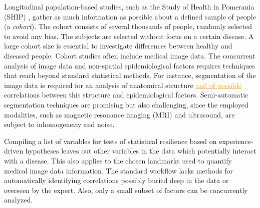 \documentclass[journal]{style/vgtc} 			          %
\newcommand{\com}[1]{\textcolor{orange}{\uline{#1}}}
\begin{document}
Longitudinal population-based studies, such as the Study of Health in Pomerania (SHIP) \cite{Volzke2011}, gather as much information as possible about a defined sample of people (a \emph{cohort}).
%
The cohort consists of several thousands of people, randomly selected to avoid any bias.
%
The subjects are selected without focus on a certain disease.
%
A large cohort size is essential to investigate differences between healthy and diseased people.
%
Cohort studies often include medical image data.
% 
The concurrent analysis of image data and non-spatial epidemiological factors requires techniques that reach beyond standard statistical methods.
%
For instance, segmentation of the image data is required for an analysis of anatomical structure \com{and of possible} correlations between this structure and epidemiological factors.
%
Semi-automatic segmentation techniques are promising but also challenging, since the employed modalities, such as magnetic resonance imaging (MRI) and ultrasound, are subject to inhomogeneity and noise.
%

Compiling a list of variables for tests of statistical resilience based on experience-driven hypotheses leaves out other variables in the data which potentially interact with a disease.
%
This also applies to the chosen landmarks used to quantify medical image data information.
%
%
The standard workflow lacks methods for automatically identifying correlations possibly buried deep in the data or overseen by the expert.
%
Also, only a small subset of factors can be concurrently analyzed.
%
\end{document}
